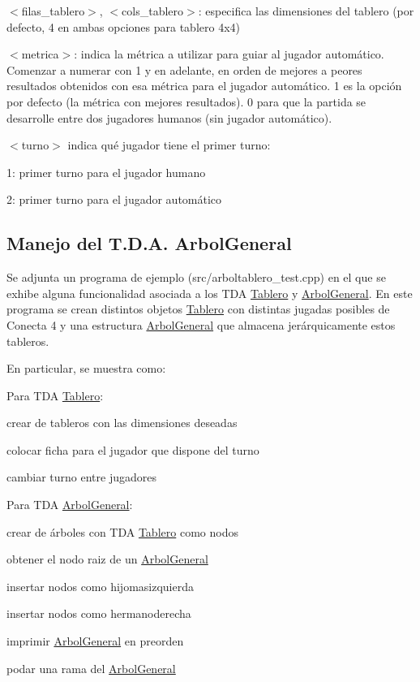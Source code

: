 \begin{DoxyItemize}
\item {\ttfamily $<$filas\+\_\+tablero$>$, $<$cols\+\_\+tablero$>$}\+: especifica las dimensiones del tablero (por defecto, 4 en ambas opciones para tablero 4x4)
\item {\ttfamily $<$metrica$>$}\+: indica la métrica a utilizar para guiar al jugador automático. Comenzar a numerar con 1 y en adelante, en orden de mejores a peores resultados obtenidos con esa métrica para el jugador automático. 1 es la opción por defecto (la métrica con mejores resultados). 0 para que la partida se desarrolle entre dos jugadores humanos (sin jugador automático).
\item {\ttfamily $<$turno$>$} indica qué jugador tiene el primer turno\+:
\begin{DoxyItemize}
\item 1\+: primer turno para el jugador humano
\item 2\+: primer turno para el jugador automático
\end{DoxyItemize}
\end{DoxyItemize}\hypertarget{index_ArbolGeneral}{}\subsection{Manejo del T.\+D.\+A. Arbol\+General}\label{index_ArbolGeneral}
Se adjunta un programa de ejemplo ({\ttfamily src/arboltablero\+\_\+test.\+cpp}) en el que se exhibe alguna funcionalidad asociada a los T\+DA \hyperlink{classTablero}{Tablero} y \hyperlink{classArbolGeneral}{Arbol\+General}. En este programa se crean distintos objetos \hyperlink{classTablero}{Tablero} con distintas jugadas posibles de Conecta 4 y una estructura \hyperlink{classArbolGeneral}{Arbol\+General} que almacena jerárquicamente estos tableros.

En particular, se muestra como\+:

Para T\+DA \hyperlink{classTablero}{Tablero}\+:
\begin{DoxyItemize}
\item crear de tableros con las dimensiones deseadas
\item colocar ficha para el jugador que dispone del turno
\item cambiar turno entre jugadores
\end{DoxyItemize}

Para T\+DA \hyperlink{classArbolGeneral}{Arbol\+General}\+:
\begin{DoxyItemize}
\item crear de árboles con T\+DA \hyperlink{classTablero}{Tablero} como nodos
\item obtener el nodo raiz de un \hyperlink{classArbolGeneral}{Arbol\+General}
\item insertar nodos como hijomasizquierda
\item insertar nodos como hermanoderecha
\item imprimir \hyperlink{classArbolGeneral}{Arbol\+General} en preorden
\item podar una rama del \hyperlink{classArbolGeneral}{Arbol\+General}
\end{DoxyItemize}


